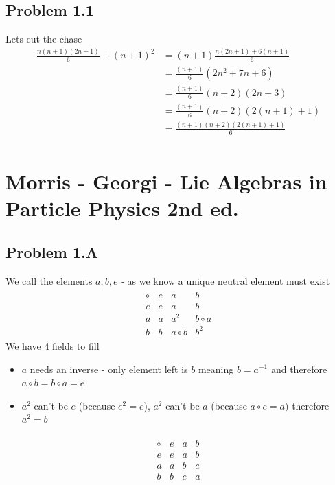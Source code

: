 \documentclass[10pt,a4paper]{book}
\theoremstyle{definition}
\begin{document}
\subsection{Problem 1.1}
Lets cut the chase
\begin{align}
\frac{n(n+1)(2n+1)}{6}+(n+1)^2
&=(n+1)\frac{n(2n+1)+6(n+1)}{6}\\
&=\frac{(n+1)}{6}(2n^2+7n+6)\\
&=\frac{(n+1)}{6}(n+2)(2n+3)\\
&=\frac{(n+1)}{6}(n+2)(2(n+1)+1)\\
&=\frac{(n+1)(n+2)(2(n+1)+1)}{6}\\
\end{align}

\section{{\sc Morris} - Georgi - Lie Algebras in Particle Physics 2nd ed.}
\subsection{Problem 1.A}
We call the elements $a, b, e$ - as we know a unique neutral element must exist 
\begin{align}
\begin{array}{c|ccc}
\circ & e & a   & b\\ \hline
e     & e & a   & b\\
a     & a & a^2 & b\circ a \\
b     & b & a\circ b & b^2
\end{array}
\end{align}
We have 4 fields to fill
\begin{itemize}
\item $a$ needs an inverse - only element left is $b$ meaning $b=a^{-1}$ and therefore $a\circ b=b\circ a=e$ 
\item $a^2$ can't be $e$ (because $e^2=e$), $a^2$ can't be $a$ (because $a\circ e = a)$ therefore $a^2=b$
\end{itemize}

\begin{align}
\begin{array}{c|ccc}
\circ & e & a   & b\\ \hline
e     & e & a   & b\\
a     & a & b & e \\
b     & b & e & a
\end{array}
\end{align}
\end{document}
